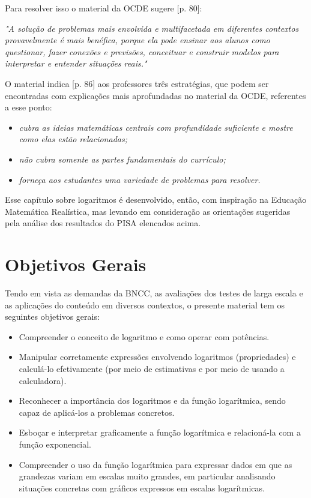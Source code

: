 \begin{apresentacao}
Para resolver isso o material da OCDE sugere [p. 80]:

\textit {"A solução de problemas mais envolvida e multifacetada em diferentes contextos provavelmente é mais benéfica, porque ela pode ensinar aos alunos como questionar, fazer conexões e previsões, conceituar e construir modelos para interpretar e entender situações reais."}

O material indica [p. 86] aos professores três estratégias, que podem ser encontradas com explicações mais aprofundadas no material da OCDE, referentes a esse ponto:
\begin{itemize}
\item \textit{cubra as ideias matemáticas centrais com profundidade suficiente e mostre como elas estão relacionadas;}
\item \textit{não cubra somente as partes fundamentais do currículo;}
\item \textit{forneça aos estudantes uma variedade de problemas para resolver.}
\end{itemize}
    
Esse capítulo sobre logaritmos é desenvolvido, então, com inspiração na Educação Matemática Realística, mas levando em consideração as orientações sugeridas pela análise dos resultados do PISA elencados acima.

\section*{Objetivos Gerais}

Tendo em vista as demandas da BNCC, as avaliações dos testes de larga escala e as aplicações do conteúdo em diversos contextos, o presente material tem os seguintes objetivos gerais:

\begin{itemize}
\item  Compreender o conceito de logaritmo e como operar com potências.
\item Manipular corretamente expressões envolvendo logaritmos (propriedades) e calculá-lo efetivamente
(por meio de estimativas e por meio de usando a calculadora).
\item Reconhecer a importância dos logaritmos e da função logarítmica, sendo capaz de
aplicá-los a problemas concretos.
\item Esboçar e interpretar graficamente a função logarítmica e relacioná-la com a função
exponencial.
\item Compreender o uso da função logarítmica para expressar dados em que as grandezas
variam em escalas muito grandes, em particular analisando situações concretas com
gráficos expressos em escalas logarítmicas.
\end{itemize}


\end{apresentacao}
